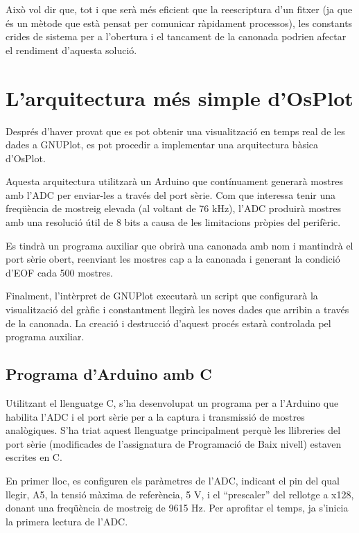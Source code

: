 \documentclass{tfgitic}[2023/06/30]
\begin{document}
Això vol dir que, tot i que serà més eficient que la reescriptura d'un
fitxer (ja que és un mètode que està pensat per comunicar ràpidament
processos), les constants crides de sistema per a l'obertura i el
tancament de la canonada podrien afectar el rendiment d'aquesta
solució.

\section{L'arquitectura més simple d'OsPlot}

Després d'haver provat que es pot obtenir una visualització en temps
real de les dades a GNUPlot, es pot procedir a implementar una
arquitectura bàsica d'OsPlot.

Aquesta arquitectura utilitzarà un Arduino que contínuament generarà
mostres amb l'ADC per enviar-les a través del port sèrie. Com que
interessa tenir una freqüència de mostreig elevada (al voltant de 76
kHz), l'ADC produirà mostres amb una resolució útil de 8 bits a causa
de les limitacions pròpies del perifèric.

Es tindrà un programa auxiliar que obrirà una canonada amb nom i
mantindrà el port sèrie obert, reenviant les mostres cap a la canonada
i generant la condició d'EOF cada 500 mostres.

Finalment, l'intèrpret de GNUPlot executarà un script que configurarà
la visualització del gràfic i constantment llegirà les noves dades que
arribin a través de la canonada. La creació i destrucció d'aquest
procés estarà controlada pel programa auxiliar.

\subsection{Programa d'Arduino amb C}
\label{programa-arduino-c}

Utilitzant el llenguatge C, s'ha desenvolupat un programa per a
l'Arduino que habilita l'ADC i el port sèrie per a la captura i
transmissió de mostres analògiques. S'ha triat aquest llenguatge
principalment perquè les llibreries del port sèrie (modificades de
l'assignatura de Programació de Baix nivell) estaven escrites en C.

En primer lloc, es configuren els paràmetres de l'ADC, indicant el pin
del qual llegir, A5, la tensió màxima de referència, 5 V, i el
``prescaler'' del rellotge a x128, donant una freqüència de mostreig
de 9615 Hz. Per aprofitar el temps, ja s'inicia la primera lectura de
l'ADC.
\end{document}
